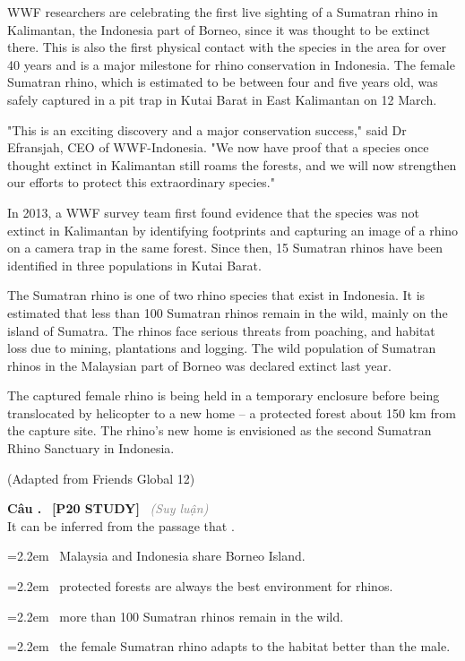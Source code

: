 \documentclass[12pt,a4paper,twoside]{article}
\newcounter{qcounter}
\newcommand{\question}[2][]{%
    \stepcounter{qcounter}%
    \par\vspace{6pt}%
    \noindent\textcolor{primaryBlue}{\textbf{Câu \theqcounter.}}~%
    \textcolor{secondaryBlue}{\small\textbf{[P20 STUDY]}}~%
    \if\relax\detokenize{#1}\relax\else\textcolor{gray}{\small\textit{(#1)}}~\fi\\[1pt]
    \noindent #2%
}
\newcommand{\choiceitem}[2]{%
    \tikz[baseline=-0.5ex]{%
        \node[draw=primaryBlue, circle, minimum size=1.5em, inner sep=0pt, thick] {\textbf{#1}};%
    }~#2%
}
\newenvironment{readingpassage}[1][]{%
    \begin{tcolorbox}[enhanced, colback=grayLight, colframe=secondaryBlue,
        coltitle=textDark, fonttitle=\bfseries, title={#1},
        rounded corners, arc=3mm, boxrule=1pt,
        left=15pt, right=15pt, top=10pt, bottom=10pt,
        breakable, before skip=10pt, after skip=10pt, drop fuzzy shadow]
    \setstretch{1.3}
}{\end{tcolorbox}}
\begin{document}
\begin{readingpassage}[]
WWF researchers are celebrating the first live sighting of a Sumatran rhino in Kalimantan, the Indonesia part of Borneo, since it was thought to be extinct there. This is also the first physical contact with the species in the area for over 40 years and is a major milestone for rhino conservation in Indonesia. The female Sumatran rhino, which is estimated to be between four and five years old, was safely captured in a pit trap in Kutai Barat in East Kalimantan on 12 March.

"This is an exciting discovery and a major conservation success," said Dr Efransjah, CEO of WWF-Indonesia. "We now have proof that a species once thought extinct in Kalimantan still roams the forests, and we will now strengthen our efforts to protect this extraordinary species."

In 2013, a WWF survey team first found evidence that the species was not extinct in Kalimantan by identifying footprints and capturing an image of a rhino on a camera trap in the same forest. Since then, 15 Sumatran rhinos have been identified in three populations in Kutai Barat.

The Sumatran rhino is one of two rhino species that exist in Indonesia. It is estimated that less than 100 Sumatran rhinos remain in the wild, mainly on the island of Sumatra. The rhinos face serious threats from poaching, and habitat loss due to mining, plantations and logging. The wild population of Sumatran rhinos in the Malaysian part of Borneo was declared extinct last year.

The captured female rhino is being held in a temporary enclosure before being translocated by helicopter to a new home – a protected forest about 150 km from the capture site. The rhino's new home is envisioned as the second Sumatran Rhino Sanctuary in Indonesia.

(Adapted from Friends Global 12)
\end{readingpassage}

\question[Suy luận]{It can be inferred from the passage that \underline{\hspace{1.3cm}}.}

\par\vspace{4pt}
\noindent\hangindent=2.2em\choiceitem{A}{Malaysia and Indonesia share Borneo Island.}\par\vspace{4pt}
\noindent\hangindent=2.2em\choiceitem{B}{protected forests are always the best environment for rhinos.}\par\vspace{4pt}
\noindent\hangindent=2.2em\choiceitem{C}{more than 100 Sumatran rhinos remain in the wild.}\par\vspace{4pt}
\noindent\hangindent=2.2em\choiceitem{D}{the female Sumatran rhino adapts to the habitat better than the male.}\par\vspace{4pt}
\end{document}
